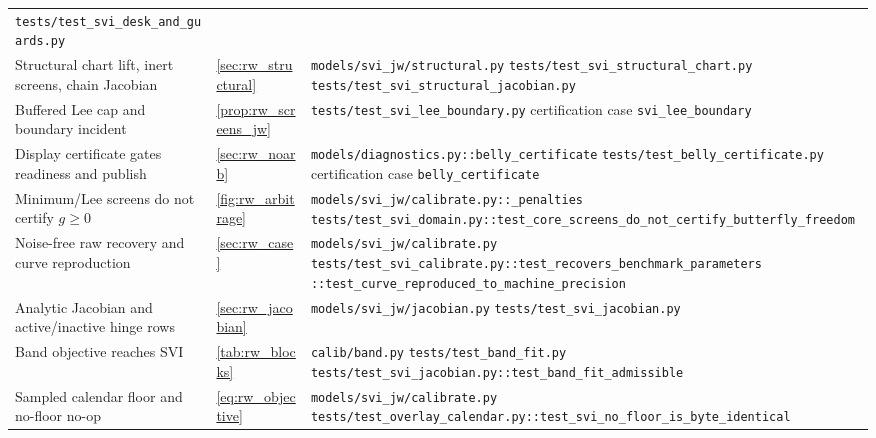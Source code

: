 \documentclass[11pt]{article}
\begin{document}
\begin{longtable}{@{}p{}p{}p{}@{}}
\nolinkurl{tests/test_svi_desk_and_guards.py}\\
\addlinespace
Structural chart lift, inert screens, chain Jacobian &
\cref{sec:rw_structural} &
\nolinkurl{models/svi_jw/structural.py}\newline
\nolinkurl{tests/test_svi_structural_chart.py}\newline
\nolinkurl{tests/test_svi_structural_jacobian.py}\\
\addlinespace
Buffered Lee cap and boundary incident &
\cref{prop:rw_screens_jw} &
\nolinkurl{tests/test_svi_lee_boundary.py}\newline
certification case \texttt{svi\_lee\_boundary}\\
\addlinespace
Display certificate gates readiness and publish &
\cref{sec:rw_noarb} &
\nolinkurl{models/diagnostics.py::belly_certificate}\newline
\nolinkurl{tests/test_belly_certificate.py}\newline
certification case \texttt{belly\_certificate}\\
\addlinespace
Minimum/Lee screens do not certify $g\ge0$ &
\cref{fig:rw_arbitrage} &
\nolinkurl{models/svi_jw/calibrate.py::_penalties}\newline
\nolinkurl{tests/test_svi_domain.py::test_core_screens_do_not_certify_butterfly_freedom}\\
\addlinespace
Noise-free raw recovery and curve reproduction &
\cref{sec:rw_case} &
\nolinkurl{models/svi_jw/calibrate.py}\newline
\nolinkurl{tests/test_svi_calibrate.py::test_recovers_benchmark_parameters}\newline
\nolinkurl{::test_curve_reproduced_to_machine_precision}\\
\addlinespace
Analytic Jacobian and active/inactive hinge rows &
\cref{sec:rw_jacobian} &
\nolinkurl{models/svi_jw/jacobian.py}\newline
\nolinkurl{tests/test_svi_jacobian.py}\\
\addlinespace
Band objective reaches SVI &
\cref{tab:rw_blocks} &
\nolinkurl{calib/band.py}\newline
\nolinkurl{tests/test_band_fit.py}\newline
\nolinkurl{tests/test_svi_jacobian.py::test_band_fit_admissible}\\
\addlinespace
Sampled calendar floor and no-floor no-op &
\cref{eq:rw_objective} &
\nolinkurl{models/svi_jw/calibrate.py}\newline
\nolinkurl{tests/test_overlay_calendar.py::test_svi_no_floor_is_byte_identical}\newline

\end{longtable}
\end{document}
